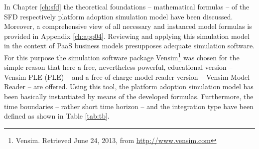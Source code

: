 In Chapter \ref{ch:sfd} the theoretical foundations -- mathematical formulas -- of the \ac{SFD} respectively platform adoption simulation model have been discussed. Moreover, a comprehensive view of all necessary and instanced model formulas is provided in Appendix \ref{ch:app04}. Reviewing and applying this simulation model in the context of \ac{PaaS} business models presupposes adequate simulation software. For this purpose the simulation software package Vensim\footnote{Vensim. Retrieved June 24, 2013, from \url{http://www.vensim.com}} was chosen for the simple reason that here a free, nevertheless powerful, educational version -- Vensim \acs{PLE} (\acl{PLE}) -- and a free of charge model reader version -- Vensim Model Reader -- are offered. Using this tool, the platform adoption simulation model has been basically instantiated by means of the developed formulas. Furthermore, the time boundaries -- rather short time horizon -- and the integration type have been defined as shown in Table \ref{tab:tb}.

